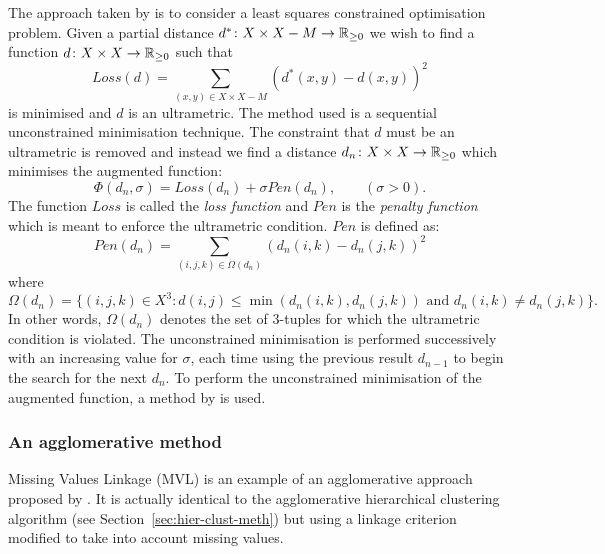 The approach taken by \cite{de1984ultrametric} is to consider a least squares
constrained optimisation problem.  Given a partial distance $d^* \colon X
\times X - M \to {\mathbb R}_{\geq 0}$ we wish to find a function $d \colon X \times X \to
{\mathbb R}_{\geq 0}$ such that
\begin{equation*}
  \label{eq:partial-dist-least-squares}
  Loss(d) = \sum_{(x,y) \in X \times X - M} (d^*(x,y)-d(x,y))^2
\end{equation*}
is minimised and $d$ is an ultrametric.  The method used is a sequential
unconstrained minimisation technique.  The constraint that $d$ must be an
ultrametric is removed and instead we find a distance $d_n \colon X \times X
\to {\mathbb R}_{\geq 0}$ which minimises the augmented function:
\begin{equation*}
  \label{eq:partial-dist-optimisation}
  \Phi(d_n,\sigma) = Loss(d_n) + \sigma Pen(d_n), \qquad (\sigma > 0).
\end{equation*}
The function $Loss$ is called the \textit{loss function} and $Pen$ is the
\textit{penalty function} which is meant to enforce the ultrametric
condition.  $Pen$ is defined as:
\begin{equation*}
  \label{eq:penalty-function}
  Pen(d_n) = \sum_{(i,j,k) \in \Omega(d_n)} (d_n(i,k) - d_n(j,k))^2
\end{equation*}
where
\begin{equation*}
  \Omega(d_n) = \{(i,j,k) \in X^3 \colon d(i,j) \leq \min(d_n(i,k),d_n(j,k))
  \text{ and } d_n(i,k) \neq d_n(j,k)\}.
\end{equation*}
In other words, $\Omega(d_n)$ denotes the set of $3$-tuples for which the
ultrametric condition is violated.  The unconstrained minimisation is
performed successively with an increasing value for $\sigma$, each time using
the previous result $d_{n-1}$ to begin the search for the next $d_n$.  To
perform the unconstrained minimisation of the augmented function, a method by
\cite{powell1977restart} is used.

\subsubsection{An agglomerative method}
\label{sec:part-dist-agglom-method}

Missing Values Linkage (MVL) is an example of an agglomerative approach
proposed by \cite{schader1992mvl}.  It is actually identical to the
agglomerative hierarchical clustering algorithm (see
Section~\ref{sec:hier-clust-meth}) but using a linkage criterion modified to
take into account missing values.

